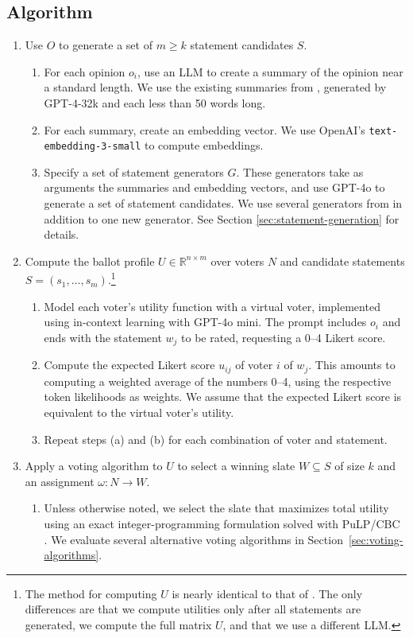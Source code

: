 \documentclass[11pt]{article}
\begin{document}
\subsection{Algorithm}
\begin{enumerate}
    \item Use $O$ to generate a set of $m \geq k$ statement candidates $S$.
    \begin{enumerate}
        \item For each opinion $o_i$, use an LLM to create a summary of the opinion near a standard length. We use the existing summaries from \citet{fish-v2}, generated by GPT-4-32k and each less than 50 words long.
        \item For each summary, create an embedding vector. We use OpenAI's \texttt{text-embedding-3-small} to compute embeddings.
        \item Specify a set of statement generators $G$. These generators take as arguments the summaries and embedding vectors, and use GPT-4o to generate a set of statement candidates. We use several generators from \citet{fish-v2} in addition to one new generator. See Section \ref{sec:statement-generation} for details.
    \end{enumerate}

    \item Compute the ballot profile \(U\in \mathbb{R}^{n\times m}\) over voters \(N\) and candidate statements \(S=(s_1,\ldots,s_m)\).\footnote{The method for computing $U$ is nearly identical to that of \citet{fish-v2}. The only differences are that we compute utilities only after all statements are generated, we compute the full matrix $U$, and that we use a different LLM.}
    \begin{enumerate}
        \item Model each voter’s utility function with a virtual voter, implemented using in-context learning with GPT-4o mini. The prompt includes $o_i$ and ends with the statement $w_j$ to be rated, requesting a 0--4 Likert score.
        \item Compute the expected Likert score $u_{ij}$ of voter $i$ of $w_j$. This amounts to computing a weighted average of the numbers 0--4, using the respective token likelihoods as weights. We assume that the expected Likert score is equivalent to the virtual voter’s utility.
        \item Repeat steps (a) and (b) for each combination of voter and statement.
    \end{enumerate}

  \item Apply a voting algorithm to \(U\) to select a winning slate \(W\subseteq S\) of size \(k\) and an assignment \(\omega:N\to W\).
  \begin{enumerate}
      \item Unless otherwise noted, we select the slate that maximizes total utility using an exact integer-programming formulation solved with PuLP/CBC \citep{pulp, john_forrest_cbc}. We evaluate several alternative voting algorithms in Section~\ref{sec:voting-algorithms}.
  \end{enumerate}

\end{enumerate}
\end{document}
